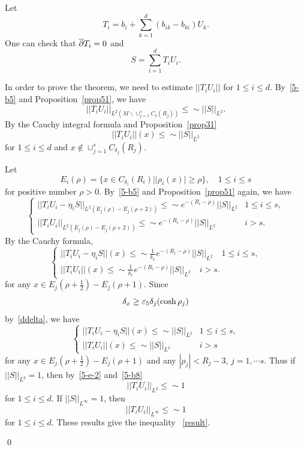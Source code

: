 Let
\[
T_i=b_i+\sum_{k=1}^d(b_{ik}-b_{ki}) U_k.
\]
One can check that $\overline{\partial} T_i=0$ and
\[
S=\sum_{i=1}^dT_iU_i.
\]

In order to prove the theorem, we need to estimate $||T_iU_i||$
for $1\leq i\leq d$. By~\eqref{5-b5} and Proposition~\ref{prop51}, we have
\begin{equation}\label{5-e-1}
||T_iU_i||_{L^2(M\backslash \cup_{j=1}^sC_\delta(R_j))}
\leq\sim ||S||_{L^2}.
\end{equation}
 By the Cauchy integral formula and Proposition~\ref{prop31}
\begin{equation}\label{5-e-2}
||T_iU_i||(x)\leq\sim ||S||_{L^2}
\end{equation}
for $1\leq i\leq d$ and $x\notin \cup_{j=1}^sC_{\delta_j}(R_j)$.

Let
\[
E_i(\rho)=\{x\in C_{\delta_i}(R_i)||\rho_i(x)|\geq\rho\}, \quad
1\leq i\leq s
\]
for positive number $\rho>0$.
By~\eqref{5-b5} and Proposition~\ref{prop51} again, we have
\begin{equation}\label{5-b6}
\left\{
\begin{array}{ll}
 ||T_iU_i-\eta_iS||_{L^2(E_j(\rho)-E_j(\rho+2))}\leq
\sim e^{-(R_i-\rho)}||S||_{L^2}& 1\leq i\leq s,\\
 ||T_iU_i||_{L^2(E_j(\rho)-E_j(\rho+2))}\leq\sim e^{-(R_i-\rho)}
||S||_{L^2} &i>s.
\end{array}
\right.
\end{equation}
 By the Cauchy formula,
\begin{equation}\label{5-b7}
\left\{
\begin{array}{l}
||T_iU_i-\eta_iS||(x)\leq\sim \frac{1}{\delta_x}e^{-(R_i-\rho)}
||S||_{L^2}\quad 1\leq i\leq s,\\
||T_iU_i||(x)\leq\sim \frac{1}{\delta_x}e^{-(R_i-\rho)}
||S||_{L^2}\quad i>s.
\end{array}
\right.
\end{equation}
for any $x\in E_j(\rho+\frac 12)-E_j(\rho+1)$.
Since
\[
\delta_x\geq\varepsilon_5\delta_j(\cosh\rho_j)
\]
by~\eqref{ddelta}, we have
\begin{equation}\label{5-b8}
\left\{
\begin{array}{ll}
||T_iU_i-\eta_iS||(x)\leq\sim ||S||_{L^2} & 1\leq i\leq s,\\
||T_iU_i||(x)\leq\sim ||S||_{L^2} & i>s
\end{array}
\right.
\end{equation}
for any $x\in E_j(\rho+\frac 12)-E_j(\rho+1)$ and any $|\rho_j|<R_j-3$,
$j=1,\cdots s$. Thus
if $||S||_{L^2}=1$, then by~\eqref{5-e-2} and~\eqref{5-b8}
\[
||T_iU_i||_{L^2}\leq\sim 1
\]
for $1\leq i\leq d$. If $||S||_{L^\infty}=1$, then
\[
||T_iU_i||_{L^\infty}\leq\sim 1
\]
for $1\leq i\leq d$.
These results give the inequality  ~\eqref{result}.

\qed

